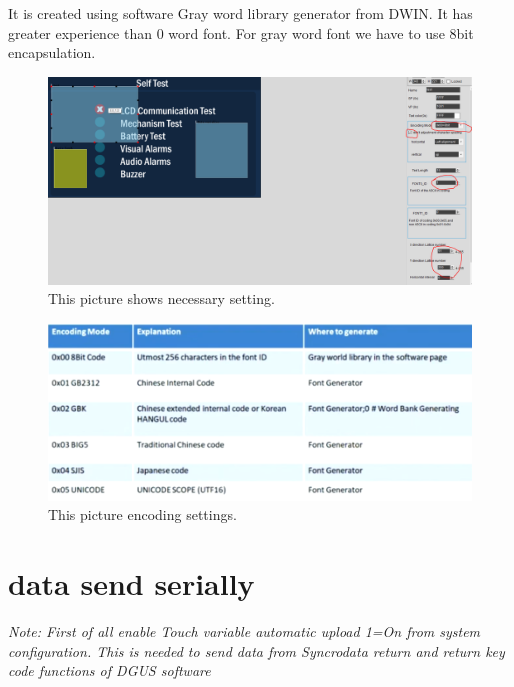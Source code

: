 \documentclass[12pt, A4]{article} %
\begin{document}
It is created using software Gray word library generator from DWIN. It has greater experience than 0 word font. For gray word font we have to use 8bit encapsulation.

\begin{figure}[!htb] %
	\centering
	\includegraphics[width=14cm]{grayFont} 
	\caption{This picture shows necessary setting.}
\end{figure}

\begin{figure}[!htb] %
	\centering
	\includegraphics[width=14cm]{encoding} 
	\caption{This picture encoding settings.}
\end{figure}


\newpage


\section{data send serially}

\emph{Note: First of all enable Touch variable automatic upload 1=On from system configuration. This is needed to send data from Syncrodata return and return key code functions of DGUS software}
\end{document}
